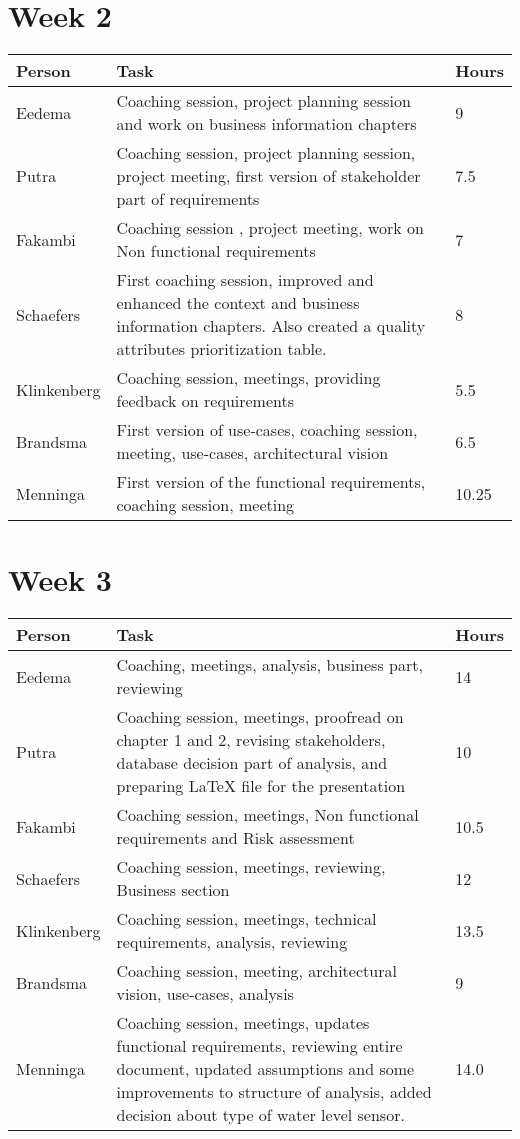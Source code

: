 \section{Week 2}
\begin{tabular}{L{0.2\textwidth} L{0.7\textwidth} L{0.1\textwidth}}
    \textbf{Person} & \textbf{Task} & \textbf{Hours} \\ \toprule
	Eedema & Coaching session, project planning session and work on business information chapters & 9  \\ \midrule
	Putra & Coaching session, project planning session, project meeting, first version of stakeholder part of requirements & 7.5 \\ \midrule
	Fakambi & Coaching session , project meeting, work on Non functional requirements & 7 \\ \midrule
	Schaefers & First coaching session, improved and enhanced the context and business information chapters. Also created a quality attributes prioritization table.& 8 \\ \midrule
	Klinkenberg & Coaching session, meetings, providing feedback on requirements & 5.5\\ \midrule
	Brandsma & First version of use-cases, coaching session, meeting, use-cases, architectural vision & 6.5 \\ \midrule
	Menninga & First version of the functional requirements, coaching session, meeting & 10.25 \\ \bottomrule
\end{tabular}

\section{Week 3}
\begin{tabular}{p{} p{} p{}}
   \textbf{Person} & \textbf{Task} & \textbf{Hours} \\ \midrule
	Eedema &  Coaching, meetings, analysis, business part, reviewing & 14  \\ \midrule
	Putra & Coaching session, meetings, proofread on chapter 1 and 2, revising stakeholders, database decision part of analysis, and preparing \LaTeX{} file for the presentation & 10 \\ \midrule
	Fakambi & Coaching session, meetings, Non functional requirements and Risk assessment & 10.5\\ \midrule
	Schaefers & Coaching session, meetings, reviewing, Business section & 12 \\ \midrule
	Klinkenberg & Coaching session, meetings, technical requirements, analysis, reviewing & 13.5 \\ \midrule
	Brandsma & Coaching session, meeting, architectural vision, use-cases, analysis & 9 \\ \midrule
	Menninga & Coaching session, meetings, updates functional requirements, reviewing entire document, updated assumptions and some improvements to structure of analysis, added decision about type of water level sensor. & 14.0 \\ \midrule
\end{tabular}